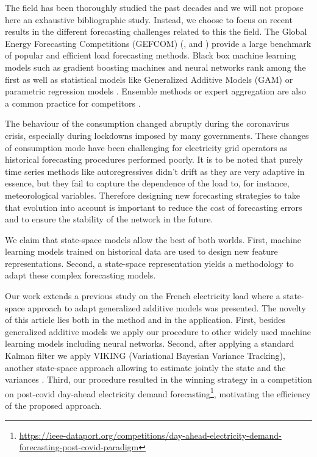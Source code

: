 \documentclass[transmag]{IEEEtran}
\begin{document}
The field has been thoroughly studied the past decades and we will not propose here an exhaustive bibliographic study. Instead, we choose  to focus on recent results in the different forecasting challenges related  to this the field. The Global Energy Forecasting Competitions (GEFCOM) (\cite{hong2014global}, \cite{HONG2016896} and \cite{hong2019global}) provide a large benchmark of popular and efficient load forecasting methods. Black box machine learning models such as gradient boosting machines \cite{lloyd2014gefcom2012} and neural networks \cite{ryu2017deep, dimoulkas2019neural} rank among the first as  well as statistical models like Generalized Additive Models (GAM) \cite{nedellec2014gefcom2012, dordonnat2016gefcom2014} or parametric regression models \cite{CHARLTON2014364, ZIEL20191400}. Ensemble methods or expert aggregation are also a common practice for competitors \cite{gaillard2016additive, smyl2019machine}.




The behaviour of the consumption changed abruptly during the coronavirus crisis, especially during lockdowns imposed by many governments. These changes of consumption mode have been challenging for electricity grid operators as historical forecasting procedures performed poorly. It is to be noted that purely time series methods like autoregressives didn't drift as they are very adaptive in essence, but they fail to capture the dependence of the load to, for instance, meteorological variables. Therefore designing new forecasting strategies to take that evolution into account is important to reduce the cost of forecasting errors and to ensure the stability of the network in the future.

We claim that state-space models allow the best of both worlds. First, machine learning models trained on historical data are used to design new feature representations. Second, a state-space representation yields a methodology to adapt these complex forecasting models.

Our work extends a previous study on the French electricity load \cite{obst2021adaptive} where a state-space approach to adapt generalized additive models was presented.
The novelty of this article lies both in the method and in the application. First, besides generalized additive models we apply our procedure to other widely used machine learning models including neural networks. Second, after applying a standard Kalman filter we apply VIKING (Variational Bayesian Variance Tracking), another state-space approach allowing to estimate jointly the state and the variances \cite{tsw}. Third, our procedure resulted in the winning strategy in a competition on post-covid day-ahead electricity demand forecasting\footnote{\href{https://ieee-dataport.org/competitions/day-ahead-electricity-demand-forecasting-post-covid-paradigm}{https://ieee-dataport.org/competitions/day-ahead-electricity-demand-forecasting-post-covid-paradigm}}, motivating the efficiency of the proposed approach.
\end{document}
